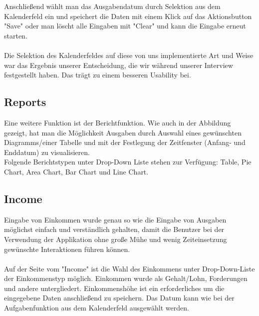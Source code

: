 \documentclass[runningheads,a4paper]{llncs}
\begin{document}
Anschließend wählt man das Ausgabendatum durch Selektion aus dem Kalenderfeld ein und speichert die Daten mit einem Klick auf das Aktionsbutton "Save" oder man löscht alle Eingaben mit "Clear" und kann die Eingabe erneut starten.  \\\\Die Selektion des Kalenderfeldes auf diese von uns implementierte Art und Weise war das Ergebnis unserer Entscheidung, die wir während unserer Interview festgestellt haben. Das trägt zu einem besseren Usability bei.


\subsection{Reports}

Eine weitere Funktion ist  der Berichtfunktion. Wie auch in der Abbildung gezeigt, hat man die Möglichkeit Ausgaben durch Auswahl eines gewünschten Diagramms/einer Tabelle und mit der Festlegung der Zeitfenster (Anfang- und Enddatum) zu visualisieren. \\Folgende Berichtstypen unter Drop-Down Liste stehen zur Verfügung: Table, Pie Chart, Area Chart, Bar Chart und Line Chart.


\subsection{Income}

Eingabe von Einkommen wurde genau so wie die Eingabe von Ausgaben möglichst einfach und verständlich gehalten, damit die Benutzer bei der Verwendung der Applikation ohne große Mühe und wenig Zeiteinsetzung gewünschte Interaktionen führen können.  \\\\Auf der Seite vom "Income" ist die Wahl des Einkommens unter Drop-Down-Liste der Einkommenstyp möglich. Einkommen wurde als Gehalt/Lohn, Forderungen und andere untergliedert. Einkommenshöhe ist ein erforderliches um die eingegebene Daten anschließend zu speichern. Das Datum kann wie bei der Aufgabenfunktion aus dem Kalenderfeld ausgewählt werden.
\clearpage
\end{document}
